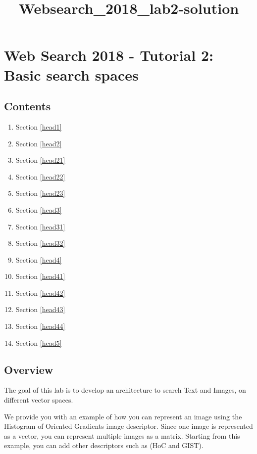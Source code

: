 \documentclass[11pt]{article}
\title{Websearch\_2018\_lab2-solution}
\providecommand{\tightlist}{%
      \setlength{\itemsep}{0pt}\setlength{\parskip}{0pt}}
\begin{document}
    
    
    \maketitle
    
    

    
    \hypertarget{web-search-2018---tutorial-2-basic-search-spaces}{%
\section{Web Search 2018 - Tutorial 2: Basic search
spaces}\label{web-search-2018---tutorial-2-basic-search-spaces}}

\hypertarget{contents}{%
\subsection{Contents}\label{contents}}

\begin{enumerate}
\def\labelenumi{\arabic{enumi}.}
\tightlist
\item
  Section \ref{head1}
\item
  Section \ref{head2}
\item
  Section \ref{head21}
\item
  Section \ref{head22}
\item
  Section \ref{head23}
\item
  Section \ref{head3}
\item
  Section \ref{head31}
\item
  Section \ref{head32}
\item
  Section \ref{head4}
\item
  Section \ref{head41}
\item
  Section \ref{head42}
\item
  Section \ref{head43}
\item
  Section \ref{head44}
\item
  Section \ref{head5}
\end{enumerate}

\hypertarget{overview}{%
\subsection{ Overview}\label{overview}}

The goal of this lab is to develop an architecture to search Text and
Images, on different vector spaces.

We provide you with an example of how you can represent an image using
the Histogram of Oriented Gradients image descriptor. Since one image is
represented as a vector, you can represent multiple images as a matrix.
Starting from this example, you can add other descriptors such as (HoC
and GIST).
\end{document}
